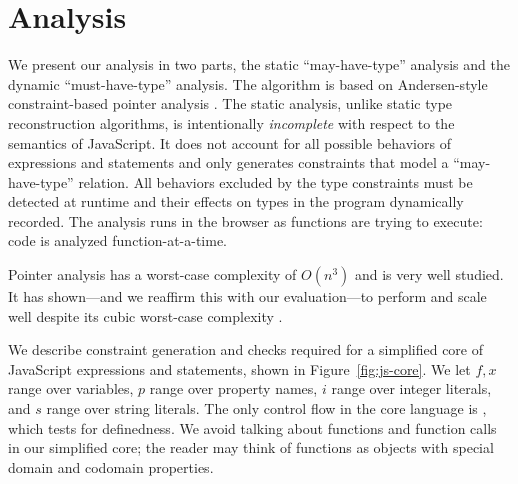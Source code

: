 \section{Analysis}

We present our analysis in two parts, the static ``may-have-type'' analysis
and the dynamic ``must-have-type'' analysis. The algorithm is based on
Andersen-style constraint-based pointer analysis \cite{AndersenPhD}. The
static analysis, unlike static type reconstruction algorithms, is
intentionally \textit{incomplete} with respect to the semantics of
JavaScript. It does not account for all possible behaviors of expressions and
statements and only generates constraints that model a ``may-have-type''
relation. All behaviors excluded by the type constraints must be detected at
runtime and their effects on types in the program dynamically recorded. The
analysis runs in the browser as functions are trying to execute: code is
analyzed function-at-a-time.

Pointer analysis has a worst-case complexity of $O(n^3)$ and is very
well studied. It has shown---and we reaffirm this with our evaluation---to
perform and scale well despite its cubic worst-case complexity
\cite{Sridharan09}.

%
%
%
%
%
%

We describe constraint generation and checks required for a simplified core of
JavaScript expressions and statements, shown in Figure~\ref{fig:js-core}. We
let $f,x$ range over variables, $p$ range over property names, $i$ range over
integer literals, and $s$ range over string literals. The only control flow in
the core language is , which tests for definedness. We avoid talking
about functions and function calls in our simplified core; the reader may
think of functions as objects with special domain and codomain properties.


